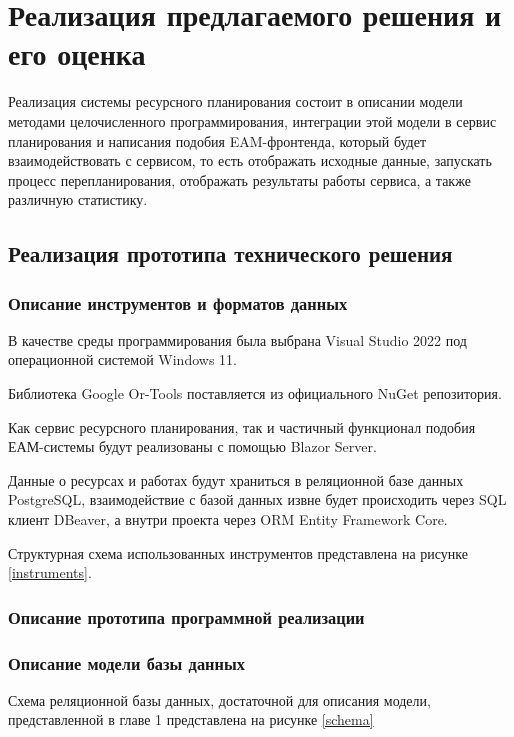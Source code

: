 \section{Реализация предлагаемого решения и его оценка}

Реализация системы ресурсного планирования состоит в описании модели методами целочисленного программирования, интеграции этой модели в сервис планирования и написания подобия EAM-фронтенда, который будет взаимодействовать с сервисом, то есть отображать исходные данные, запускать процесс перепланирования, отображать результаты работы сервиса, а также различную статистику.

\subsection{Реализация прототипа технического решения}

\subsubsection{Описание инструментов и форматов данных}

В качестве среды программирования была выбрана Visual Studio 2022 под операционной системой Windows 11.

Библиотека Google Or-Tools поставляется из официального NuGet репозитория.

Как сервис ресурсного планирования, так и частичный функционал подобия ЕАМ-системы будут реализованы с помощью Blazor Server.

Данные о ресурсах и работах будут храниться в реляционной базе данных PostgreSQL, взаимодействие с базой данных извне будет происходить через SQL клиент DBeaver, а внутри проекта через ORM Entity Framework Core.

Структурная схема использованных инструментов представлена на рисунке \ref{instruments}.


\subsubsection{Описание прототипа программной реализации}
\subsubsection{Описание модели базы данных}

Схема реляционной базы данных, достаточной для описания модели, представленной в главе 1 представлена на рисунке \ref{schema}

